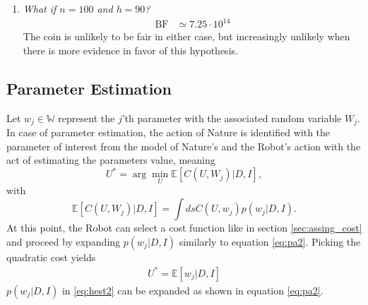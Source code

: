 \begin{example}
\begin{enumerate}
			\item \emph{What if $n=100$ and $h=90$?}
			\begin{equation}
				\begin{split}
					\text{BF}	&\simeq 7.25\cdot 10^{14}
				\end{split}
			\end{equation}
			The coin is unlikely to be fair in either case, but increasingly unlikely when there is more evidence in favor of this hypothesis.
		\end{enumerate}
	\end{example}
	

	
	\subsection{Parameter Estimation}
	Let $w_j\in \mathbb{W}$ represent the $j$'th parameter with the associated random variable $W_j$. In case of parameter estimation, the action of Nature is identified with the parameter of interest from the model of Nature's and the Robot's action with the act of estimating the parameters value, meaning
	\begin{equation}
		U^*=\arg\min_U\mathbb{E}[C(U, W_j)|D,I],
	\end{equation}
	with
	\begin{equation}
		\mathbb{E}[C(U, W_j)|D,I] = \int ds C(U,w_j)p(w_j|D,I).
	\end{equation}
	At this point, the Robot can select a cost function like in section \ref{sec:assing_cost} and proceed by expanding $p(w_j|D,I)$ similarly to equation \eqref{eq:pa2}. Picking the quadratic cost yields 
	\begin{equation}
		\begin{split}
			U^* = \mathbb{E}[w_j|D,I]
		\end{split}
		\label{eq:hest2}
	\end{equation}
	$p(w_j|D,I)$ in \eqref{eq:hest2} can be expanded as shown in equation \eqref{eq:pa2}.
	
	
	
